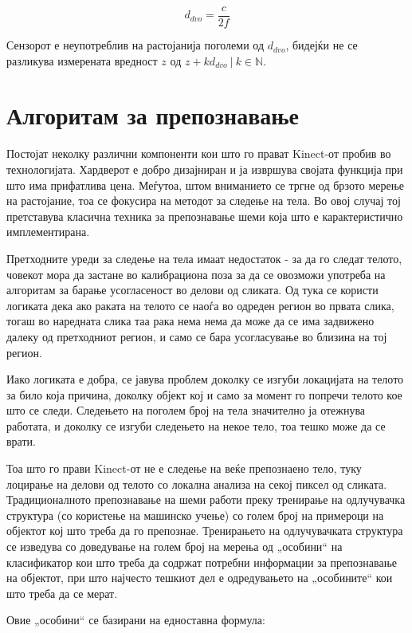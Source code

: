 \documentclass[12pt]{article}
\begin{document}
		$$ d_{dvo} = \frac{c}{2f} $$

		Сензорот е неупотреблив на растојанија поголеми од $d_{dvo}$, бидејќи не се разликува измерената вредност $z$ од $z + k d_{dvo}\ | \ k \in \mathbb{N}$.

\newpage

\section{Алгоритам за препознавање}

  Постојат неколку различни компоненти кои што го прават Kinect-от пробив во технологијата. Хардверот е добро дизајниран и ја извршува својата функција при што има прифатлива цена. Меѓутоа, штом вниманието се тргне од брзото мерење на растојание, тоа се фокусира на методот за следење на тела. Во овој случај тој претставува класична техника за препознавање шеми која што е карактеристично имплементирана.

	Претходните уреди за следење на тела имаат недостаток - за да го следат телото, човекот мора да застане во калибрациона поза за да се овозможи употреба на алгоритам за барање усогласеност во делови од сликата. Од тука се користи логиката дека ако раката на телото се наоѓа во одреден регион во првата слика, тогаш во наредната слика таа рака нема нема да може да се има задвижено далеку од претходниот регион, и само се бара усогласување во близина на тој регион.

	Иако логиката е добра, се јавува проблем доколку се изгуби локацијата на телото за било која причина, доколку објект кој и само за момент го попречи телото кое што се следи. Следењето на поголем број на тела значително ја отежнува работата, и доколку се изгуби следењето на некое тело, тоа тешко може да се врати.

	Тоа што го прави Kinect-от не е следење на веќе препознаено тело, туку лоцирање на делови од телото со локална анализа на секој пиксел од сликата. Традиционалното препознавање на шеми работи преку тренирање на одлучувачка структура (со користење на машинско учење) со голем број на примероци на објектот кој што треба да го препознае. Тренирањето на одлучувачката структура се изведува со доведување на голем број на мерења од „особини“ на класификатор кои што треба да содржат потребни информации за препознавање на објектот, при што најчесто тешкиот дел е одредувањето на „особините“ кои што треба да се мерат.

	Овие „особини“ се базирани на едноставна формула:
\end{document}
